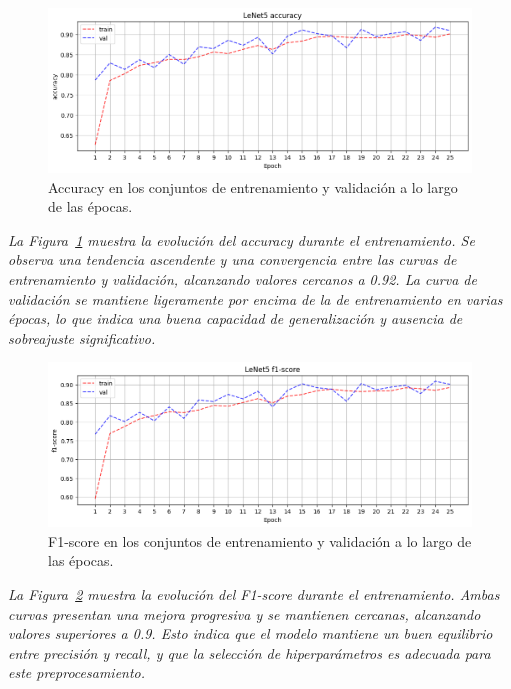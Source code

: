 \documentclass[conference]{IEEEtran}
\begin{document}

\begin{figure}[H]
    \centering
    \includegraphics[width=0.95\linewidth]{graphics-bilateral/bilateral-accuracy-train_val.png}
    \caption{Accuracy en los conjuntos de entrenamiento y validación a lo largo de las épocas.}
    \label{fig:bilateral-accuracy-train_val}
\end{figure}
\noindent\textit{
La Figura~\ref{fig:bilateral-accuracy-train_val} muestra la evolución del accuracy durante el entrenamiento. Se observa una tendencia ascendente y una convergencia entre las curvas de entrenamiento y validación, alcanzando valores cercanos a 0.92. La curva de validación se mantiene ligeramente por encima de la de entrenamiento en varias épocas, lo que indica una buena capacidad de generalización y ausencia de sobreajuste significativo.
}

\begin{figure}[H]
    \centering
    \includegraphics[width=0.95\linewidth]{graphics-bilateral/bilateral-f1score-train_val.png}
    \caption{F1-score en los conjuntos de entrenamiento y validación a lo largo de las épocas.}
    \label{fig:bilateral-f1score-train_val}
\end{figure}
\noindent\textit{
La Figura~\ref{fig:bilateral-f1score-train_val} muestra la evolución del F1-score durante el entrenamiento. Ambas curvas presentan una mejora progresiva y se mantienen cercanas, alcanzando valores superiores a 0.9. Esto indica que el modelo mantiene un buen equilibrio entre precisión y recall, y que la selección de hiperparámetros es adecuada para este preprocesamiento.
}
\end{document}
